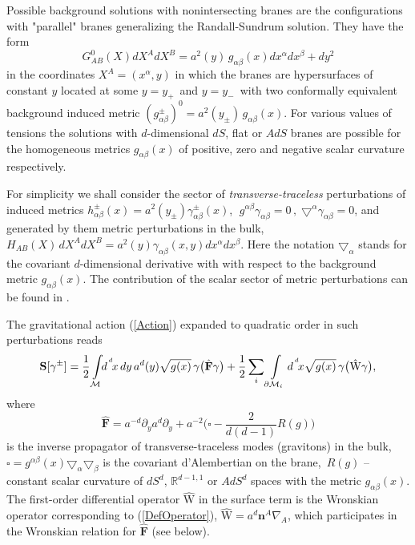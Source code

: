 \documentclass[a4paper,12pt]{article}
\newcommand{\za}{{\alpha}}   %
\newcommand{\zb}{{\beta}}    %
\newcommand{\ZA}{{A}}    %
\newcommand{\ZB}{{B}}    %
\newcommand{\p}{{+}}
\newcommand{\n}{{-}}
\newcommand{\ddim}{{d}}
\newcommand{\M}{{\cal M}}
\newcommand{\dM}{{\partial \cal M}}
\newcommand{\dx}{d^{^{\,\ddim}} \!x}
\newcommand{\R}{{\mathbb R}}
\newcommand{\un}{\mathbf n} %
\newcommand{\ddy}{{\partial_y}}
\newcommand{\bBox}{\square}  %
\newcommand{\BBox}{\hat{\mathbf{F}}}  %
\newcommand{\bnabla}{{\bigtriangledown\!}}
\newcommand{\Bnabla}{\nabla}
\newcommand{\htt}{\gamma}   %
\begin{document}
Possible background solutions with nonintersecting branes are the
configurations with "parallel" branes generalizing the Randall-Sundrum
solution. They have the form
    \begin{equation}
     G^0_{\ZA\ZB}(X)dX^{\ZA}dX^{\ZB}
     =a^2(y)\,g_{\za\zb}(x)dx^{\za}dx^{\zb}+dy^2
     \label{Background}
    \end{equation}
in the coordinates $X^\ZA=(x^\za,y)$ in which the branes are
hypersurfaces of constant $y$ located at some $y=y_\p\,$ and
$y=y_\n\,$ with two conformally equivalent background induced
metric $(g^{\pm}_{\za\zb})^0=a^2(y_\pm)\,g_{\za\zb}(x)$. For
various values of tensions the solutions with $\ddim$-dimensional
$dS$, flat or $AdS$ branes are possible \cite{Duality,BWSolutions}
for the homogeneous metrics $g_{\za\zb}(x)$ of positive, zero and
negative scalar curvature respectively.

For simplicity we shall consider the sector of
\textit{transverse-traceless} perturbations of induced metrics
$h_{\za\zb}^\pm(x)=a^2(y_\pm)\htt_{\za\zb}^\pm(x)$,
$\;g^{\za\zb}\htt_{\za\zb} =0\,, \;\bnabla^{\za}\htt_{\za\zb}=0$,
and generated by them metric perturbations in the bulk,
$H_{\ZA\ZB}(X)\,dX^\ZA dX^\ZB=a^2(y)\htt_{\za\zb}(x,y)dx^\za
dx^\zb$. Here the notation $\bnabla_\za$ stands for the covariant
$\ddim$-dimen\-sional derivative with with respect to the
background metric $g_{\za\zb}(x)$. The contribution of the scalar
sector of metric perturbations can be found in \cite{Duality}.

The gravitational action (\ref{Action}) expanded to quadratic order
in such perturbations reads \cite{Duality}
    \begin{equation}
     \mathbf{S}[\gamma^\pm]=
     \frac12 \int\limits_{\M}\!\!\dx\,dy\,a^\ddim(y)\sqrt{g(x)}\,
     \htt\big(\BBox\htt\big)+\frac12\sum_i\int
     \limits_{\dM_i}\dx\sqrt{g(x)}\,
     \htt\big(\hat{\mathrm{W}}\htt\big),
     \label{QuadrAction}
    \end{equation}
where
    \begin{equation}
     \BBox=a^{-\ddim}\ddy a^{\ddim}\ddy +
     a^{-2}\big(\bBox-\frac2{\ddim(\ddim-1)}R(g)\big)
     \label{DefOperator}
    \end{equation}
is the inverse propagator of transverse-traceless modes
(gravitons) in the bulk, $\bBox=
g^{\za\zb}(x)\bnabla_{\!\za}\bnabla_{\!\zb}$ is the covariant
d'Alembertian on the brane, $\,R(g)$ -- constant scalar curvature
of $dS^{\ddim}$, $\R^{\ddim-1,1}$ or $AdS^{\ddim}$ spaces with the
metric $g_{\za\zb}(x)$. The first-order differential operator
$\hat{\mathrm{W}}$ in the surface term is the Wronskian operator
corresponding to (\ref{DefOperator}),
$\hat{\mathrm{W}}=a^\ddim\un^\ZA\Bnabla_\ZA$, which participates
in the Wronskian relation for $\BBox$ (see below).
\end{document}
